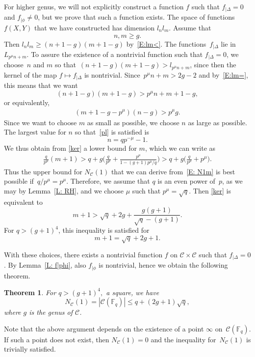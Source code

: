 \documentclass{amsart}
\newcommand\F{\mathbb{F}}
\newcommand\Curve{\mathcal{C}}
\newtheorem{theorem}{Theorem}[section]
\theoremstyle{definition}\newtheorem{definition}[theorem]{Definition}
\theoremstyle{remark}\newtheorem{remark}[theorem]{Remark}
\numberwithin{equation}{section}
\begin{document}
For higher genus,
we will not explicitly construct a function $f$ such that \mbox{$f_{|\Delta}=0$} and $f_{|\phi}\ne0$,
but we prove that such a function exists.
The space of functions~$f(X,Y)$ that we have constructed has dimension $l_nl_m$.
Assume that
$$
n,m\geq g.
$$
Then $l_nl_m\geq(n+1-g)(m+1-g)$ by~\eqref{E:lm<}.
The functions~$f_{|\Delta}$ lie in $L_{p^\mu n+m}$.
To assure the existence of a nontrivial function such that $f_{|\Delta}=0$,
we choose~$n$ and $m$ so that~\mbox{$(n+1-g)(m+1-g)>l_{p^\mu n+m}$},
since then the kernel of the map $f\mapsto f_{|\Delta}$ is nontrivial.
Since~\mbox{$p^\mu n+m>2g-2$} and by~\eqref{E:lm=},
this means that we want
$$
(n+1-g)(m+1-g)>p^\mu n+m+1-g,
$$
or equivalently,
\begin{gather}\label{ker}
(m+1-g-p^\mu)(n-g)>p^\mu g.
\end{gather}
Since we want to choose $m$ as small as possible,
we choose $n$ as large as possible.
The largest value for $n$ so that~\eqref{pl} is satisfied is
$$
n= q{p^{-\mu}}-1.
$$
We thus obtain from \eqref{ker} a lower bound for $m$,
which we can write as
\begin{gather*}%
\frac q{p^\mu}(m+1)>q+g\biggl(\frac q{p^\mu}+\frac{p^\mu}{1-(g+1)p^\mu/q}\biggr)>q+g\biggl(\frac q{p^\mu}+p^\mu\biggr).
\end{gather*}
Thus the upper bound for $N_\Curve(1)$ that we can derive from~\eqref{E: N1m} is best possible if~\mbox{$q/p^\mu=p^{\mu}$}.
Therefore,
we assume that $q$ is an even power of~$p$,
as we may by Lemma~\ref{L: RH},
and we choose $\mu$ such that $p^\mu=\sqrt q$.
Then \eqref{ker} is equivalent to
$$
m+1>\sqrt q+2g+\frac{g(g+1)}{\sqrt q-(g+1)}.
$$
For $q>(g+1)^4$,
 this inequality is satisfied for
$$
m+1=\sqrt q+2g+1.
$$

With these choices,
there exists a nontrivial function $f$ on $\Curve\times\Curve$ such that $f_{|\Delta}=0$.
By Lemma~\ref{L: f|phi},
 also $f_{|\phi}$ is nontrivial,
hence we obtain the following theorem.

\begin{theorem}\label{T: upper bound}
For\/ $q>(g+1)^4,$
a square,
we have
$$
N_\Curve(1)=|\Curve(\F_q)|\leq q+(2g+1)\sqrt{q},
$$
where\/ $g$ is the genus of\/ $\Curve$.
\end{theorem}

Note that the above argument depends on the existence of a point $\infty$ on~$\Curve(\F_q)$.
If such a point does not exist,
then $N_\Curve(1)=0$ and the inequality for~$N_\Curve(1)$ is trivially satisfied.
\end{document}
